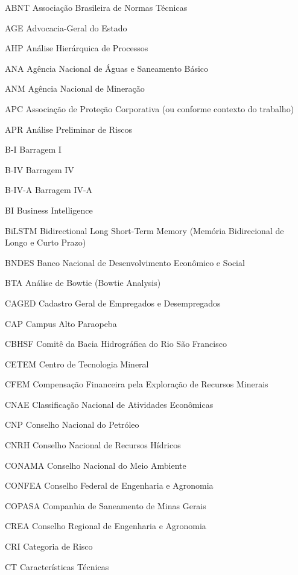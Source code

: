 \begin{siglas}
    \item[ABNT] Associação Brasileira de Normas Técnicas
    \item[AGE] Advocacia-Geral do Estado
    \item[AHP] Análise Hierárquica de Processos
    \item[ANA] Agência Nacional de Águas e Saneamento Básico
    \item[ANM] Agência Nacional de Mineração
    \item[APC] Associação de Proteção Corporativa (ou conforme contexto do trabalho)
    \item[APR] Análise Preliminar de Riscos
    \item[B-I] Barragem I
    \item[B-IV] Barragem IV
    \item[B-IV-A] Barragem IV-A
    \item[BI] Business Intelligence
    \item[BiLSTM] Bidirectional Long Short-Term Memory (Memória Bidirecional de Longo e Curto Prazo)
    \item[BNDES] Banco Nacional de Desenvolvimento Econômico e Social
    \item[BTA] Análise de Bowtie (Bowtie Analysis)
    \item[CAGED] Cadastro Geral de Empregados e Desempregados
    \item[CAP] Campus Alto Paraopeba
    \item[CBHSF] Comitê da Bacia Hidrográfica do Rio São Francisco
    \item[CETEM] Centro de Tecnologia Mineral
    \item[CFEM] Compensação Financeira pela Exploração de Recursos Minerais
    \item[CNAE] Classificação Nacional de Atividades Econômicas
    \item[CNP] Conselho Nacional do Petróleo
    \item[CNRH] Conselho Nacional de Recursos Hídricos
    \item[CONAMA] Conselho Nacional do Meio Ambiente
    \item[CONFEA] Conselho Federal de Engenharia e Agronomia
    \item[COPASA] Companhia de Saneamento de Minas Gerais
    \item[CREA] Conselho Regional de Engenharia e Agronomia
    \item[CRI] Categoria de Risco
    \item[CT] Características Técnicas

\end{siglas}
